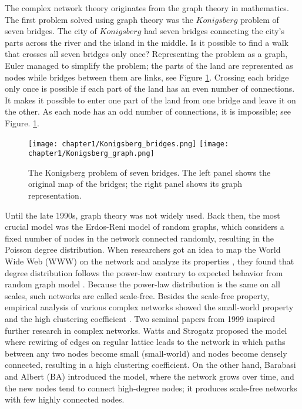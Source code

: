 The complex network theory originates from the graph theory in mathematics. The first problem solved using graph theory was the $Konigsberg$ problem of seven bridges. The city of $Konigsberg$ had seven bridges connecting the city's parts across the river and the island in the middle. Is it possible to find a walk that crosses all seven bridges only once? Representing the problem as a graph, Euler managed to simplify the problem; the parts of the land are represented as nodes while bridges between them are links, see Figure \ref{fig:Krgraph}. Crossing each bridge only once is possible if each part of the land has an even number of connections. It makes it possible to enter one part of the land from one bridge and leave it on the other. As each node has an odd number of connections, it is impossible; see Figure. \ref{fig:Krgraph}.

\begin{figure}[!ht]
	\centering
	\texttt{[image: chapter1/Konigsberg\_bridges.png]} \hspace{2cm}
	\texttt{[image: chapter1/Konigsberg\_graph.png]}
	\caption[Konigsberg problem of seven bridges.]{The Konigsberg problem of seven bridges. The left panel shows the original map of the bridges; the right panel shows its graph representation.}
	
	\label{fig:Krgraph}
\end{figure}

Until the late 1990s, graph theory was not widely used. Back then, the most crucial model was the Erdos-Reni model of random graphs, which considers a fixed number of nodes in the network connected randomly, resulting in the Poisson degree distribution. When researchers got an idea to map the World Wide Web (WWW) on the network and analyze its properties \cite{huberman1999}, they found that degree distribution follows the power-law contrary to expected behavior from random graph model \cite{dorogovtsev2010complex}. Because the power-law distribution is the same on all scales, such networks are called scale-free. Besides the scale-free property, empirical analysis of various complex networks showed the small-world property and the high clustering coefficient \cite{barabasi2009,newman2010}. Two seminal papers from 1999 inspired further research in complex networks. Watts and Strogatz \cite{watts1998collective} proposed the model where rewiring of edges on regular lattice leads to the network in which paths between any two nodes become small (small-world) and nodes become densely connected, resulting in a high clustering coefficient. On the other hand, Barabasi and Albert (BA) \cite{barabasi1999} introduced the model, where the network grows over time, and the new nodes tend to connect high-degree nodes; it produces scale-free networks with few highly connected nodes. 

